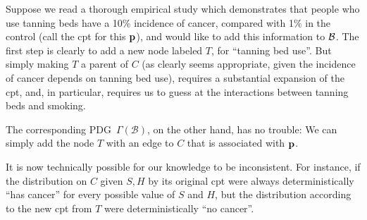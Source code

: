 \documentclass{article}
\newcommand{\MN}{PDG}
\numberwithin{equation}{section}
\begin{document}
	\begin{example}[continues=ex:smoking]
		Suppose we read a thorough empirical study which demonstrates that people who use tanning beds have a 10\% incidence of cancer, compared with 1\% in the control (call the cpt for this $\mathbf p$), and would like to add this information to $\cal B$. 
		The first step is clearly to add a new node labeled $T$, for ``tanning bed use''.  But simply making $T$ a parent of $C$ (as clearly seems appropriate, given the incidence of cancer depends on tanning bed use), requires a substantial expansion of the cpt, and, in particular, requires us to guess at the interactions between tanning beds and smoking. 
		
		
		The corresponding \MN\, $\Gamma(\mathcal B)$, on the other hand, has no trouble:
		We can simply add the node $T$ with an edge to $C$ that is associated with $\mathbf p$. 
		
		It is now technically possible for our knowledge to be inconsistent. For instance, if the distribution on $C$ given $S,H$ by its original cpt were always deterministically ``has cancer'' for every possible value of $S$ and $H$, but the distribution according to the new cpt from $T$ were deterministically ``no cancer''. 
		

%			
	       
	\end{example}	
\end{document}
